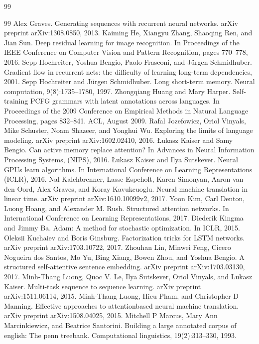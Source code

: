 \documentclass[conference]{IEEEtran}
\begin{document}
\begin{thebibliography}{99}
\begin{thebibliography}{99}
 Alex Graves. Generating sequences with recurrent neural networks. arXiv preprint arXiv:1308.0850, 2013.
 Kaiming He, Xiangyu Zhang, Shaoqing Ren, and Jian Sun. Deep residual learning for image recognition. In Proceedings of the IEEE Conference on Computer Vision and Pattern Recognition, pages 770--778, 2016.
 Sepp Hochreiter, Yoshua Bengio, Paolo Frasconi, and Jürgen Schmidhuber. Gradient flow in recurrent nets: the difficulty of learning long-term dependencies, 2001.
 Sepp Hochreiter and Jürgen Schmidhuber. Long short-term memory. Neural computation, 9(8):1735--1780, 1997.
 Zhongqiang Huang and Mary Harper. Self-training PCFG grammars with latent annotations across languages. In Proceedings of the 2009 Conference on Empirical Methods in Natural Language Processing, pages 832--841. ACL, August 2009.
 Rafal Jozefowicz, Oriol Vinyals, Mike Schuster, Noam Shazeer, and Yonghui Wu. Exploring the limits of language modeling. arXiv preprint arXiv:1602.02410, 2016.
 Łukasz Kaiser and Samy Bengio. Can active memory replace attention? In Advances in Neural Information Processing Systems, (NIPS), 2016.
 Łukasz Kaiser and Ilya Sutskever. Neural GPUs learn algorithms. In International Conference on Learning Representations (ICLR), 2016.
 Nal Kalchbrenner, Lasse Espeholt, Karen Simonyan, Aaron van den Oord, Alex Graves, and Koray Kavukcuoglu. Neural machine translation in linear time. arXiv preprint arXiv:1610.10099v2, 2017.
 Yoon Kim, Carl Denton, Luong Hoang, and Alexander M. Rush. Structured attention networks. In International Conference on Learning Representations, 2017.
 Diederik Kingma and Jimmy Ba. Adam: A method for stochastic optimization. In ICLR, 2015.
 Oleksii Kuchaiev and Boris Ginsburg. Factorization tricks for LSTM networks. arXiv preprint arXiv:1703.10722, 2017.
 Zhouhan Lin, Minwei Feng, Cicero Nogueira dos Santos, Mo Yu, Bing Xiang, Bowen Zhou, and Yoshua Bengio. A structured self-attentive sentence embedding. arXiv preprint arXiv:1703.03130, 2017.
 Minh-Thang Luong, Quoc V. Le, Ilya Sutskever, Oriol Vinyals, and Lukasz Kaiser. Multi-task sequence to sequence learning. arXiv preprint arXiv:1511.06114, 2015.
 Minh-Thang Luong, Hieu Pham, and Christopher D Manning. Effective approaches to attentionbased neural machine translation. arXiv preprint arXiv:1508.04025, 2015.
 Mitchell P Marcus, Mary Ann Marcinkiewicz, and Beatrice Santorini. Building a large annotated corpus of english: The penn treebank. Computational linguistics, 19(2):313--330, 1993.

\end{thebibliography}
\end{thebibliography}
\end{document}
